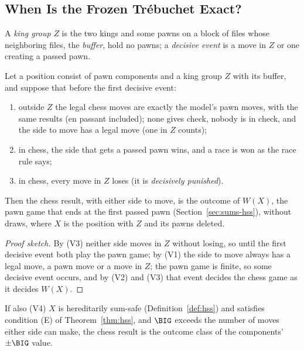 \subsection{When Is the Frozen Tr\'ebuchet Exact?}\label{sec:kings-valid}

A \emph{king group} $Z$ is the two kings and some pawns on a block of files whose neighboring files, the
\emph{buffer}, hold no pawns; a \emph{decisive event} is a move in $Z$ or one creating a passed pawn.

\begin{theorem}\label{thm:validity}
Let a position consist of pawn components and a king group $Z$ with its buffer, and suppose that before the
first decisive event:
\begin{enumerate}
\item[(V1)] outside $Z$ the legal chess moves are exactly the model's pawn moves, with the same results (en
  passant included); none gives check, nobody is in check, and the side to move has a legal move (one in $Z$
  counts);
\item[(V2)] in chess, the side that gets a passed pawn wins, and a race is won as the race rule says;
\item[(V3)] in chess, every move in $Z$ loses (it is \emph{decisively punished}).
\end{enumerate}
Then the chess result, with either side to move, is the outcome of $W(X)$, the pawn game that ends at the first
passed pawn (Section~\ref{sec:sums-hss}), without draws, where $X$ is the position with $Z$ and its pawns deleted.
\end{theorem}

\begin{proof}[Proof sketch]
By (V3) neither side moves in $Z$ without losing, so until the first decisive event both play the pawn game;
by (V1) the side to move always has a legal move, a pawn move or a move in $Z$; the pawn game is finite, so some
decisive event occurs, and by (V2) and (V3) that event
decides the chess game as it decides $W(X)$.
\end{proof}

\begin{corollary}[\lab{S}]\label{cor:v4}
If also (V4) $X$ is hereditarily sum-safe (Definition~\ref{def:hss}) and satisfies condition (E) of
Theorem~\ref{thm:hss}, and $\BIG$ exceeds the number of moves either side can make, the chess result is
the outcome class of the components' $\pm\BIG$ value.
\end{corollary}

